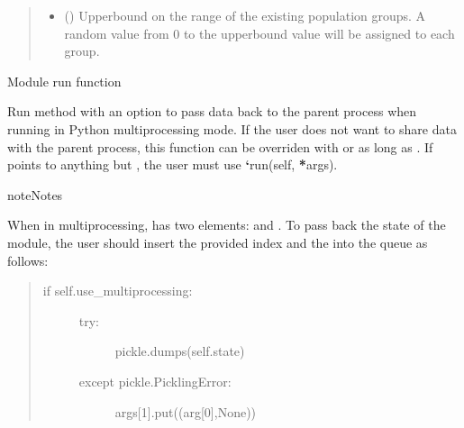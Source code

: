\documentclass[letterpaper,10pt,openany,oneside,english]{sphinxmanual}
\begin{document}
\begin{fulllineitems}
\begin{fulllineitems}
\begin{quote}
\begin{description}
\begin{itemize}
\item {} 
 () \textendash{} Upperbound on the range of the existing population groups. A random value
from 0 to the upperbound value will be assigned to each group.

\end{itemize}

\end{description}\end{quote}

\end{fulllineitems}


\begin{fulllineitems}
\label{\detokenize{examples_rst/adjudication:adjudication.Adjudication.run}}
Module run function

Run method with an option to pass data back to the parent process when running
in Python multiprocessing mode. If the user does not want to share data with
the parent process, this function can be overriden with 
or  as long as .
If  points to anything but , the user must use
{\color{red}\bfseries{}{}`}run(self, {\color{red}\bfseries{}*}args).

\begin{sphinxadmonition}{note}{Notes}

When in multiprocessing,  has two elements:  and .
To pass back the state of the module, the user should insert the provided
index  and the  into the queue as follows:
\begin{quote}
\begin{description}
\item[{if self.use\_multiprocessing:}] \leavevmode\begin{description}
\item[{try:}] \leavevmode
pickle.dumps(self.state)

\item[{except pickle.PicklingError:}] \leavevmode
args{[}1{]}.put((arg{[}0{]},None))


\end{description}
\end{description}
\end{quote}
\end{sphinxadmonition}
\end{fulllineitems}
\end{fulllineitems}
\end{document}
